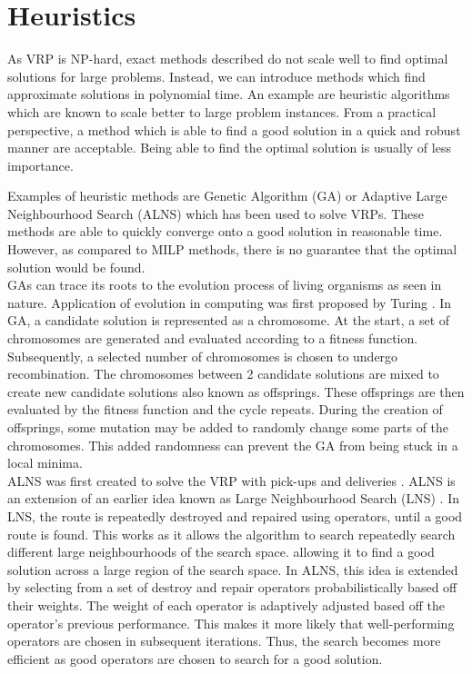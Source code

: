 \section{Heuristics}
As VRP is NP-hard, exact methods described do not scale well to find optimal solutions for large problems. Instead, we can introduce methods which find approximate solutions in polynomial time. An example are heuristic algorithms which are known to scale better to large problem instances. From a practical perspective, a method which is able to find a good solution in a quick and robust manner are acceptable. Being able to find the optimal solution is usually of less importance.

Examples of heuristic methods are Genetic Algorithm (GA) or Adaptive Large Neighbourhood Search (ALNS) which has been used to solve VRPs. These methods are able to quickly converge onto a good solution in reasonable time. However, as compared to MILP methods, there is no guarantee that the optimal solution would be found. \\

GAs can trace its roots to the evolution process of living organisms as seen in nature. Application of evolution in computing was first proposed by Turing \cite{turing_computing_1950}. In GA, a candidate solution is represented as a chromosome. At the start, a set of chromosomes are generated and evaluated according to a fitness function. Subsequently, a selected number of chromosomes is chosen to undergo recombination. The chromosomes between 2 candidate solutions are mixed to create new candidate solutions also known as offsprings. These offsprings are then evaluated by the fitness function and the cycle repeats. During the creation of offsprings, some mutation may be added to randomly change some parts of the chromosomes. This added randomness can prevent the GA from being stuck in a local minima. \\

ALNS was first created to solve the VRP with pick-ups and deliveries \cite{ropke_adaptive_2006}. ALNS is an extension of an earlier idea known as Large Neighbourhood Search (LNS) \cite{goos_using_1998}. In LNS, the route is repeatedly destroyed and repaired using operators, until a good route is found. This works as it allows the algorithm to search repeatedly search different large neighbourhoods of the search space. allowing it to find a good solution across a large region of the search space. In ALNS, this idea is extended by selecting from a set of destroy and repair operators probabilistically based off their weights. The weight of each operator is adaptively adjusted based off the operator's previous performance. This makes it more likely that well-performing operators are chosen in subsequent iterations. Thus, the search becomes more efficient as good operators are chosen to search for a good solution.

